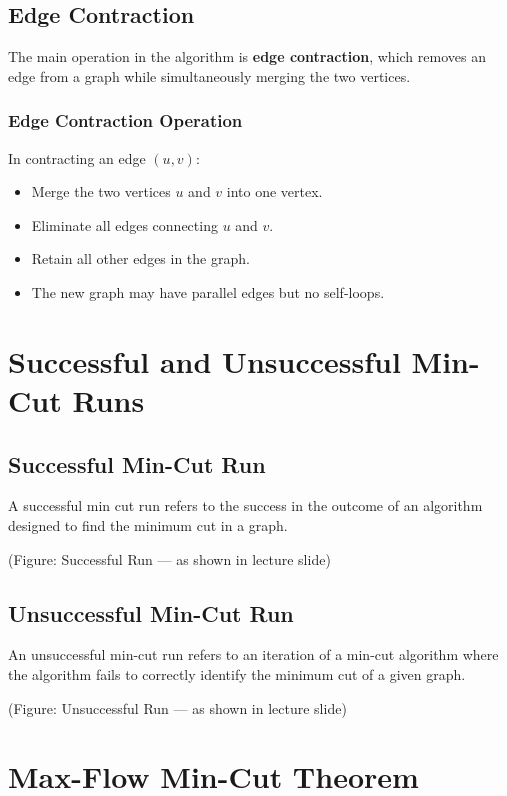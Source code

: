 \documentclass[12pt]{article}
\begin{document}
\subsection{Edge Contraction}

The main operation in the algorithm is \textbf{edge contraction}, which removes an edge from a graph while simultaneously merging the two vertices.

\subsubsection*{Edge Contraction Operation}

In contracting an edge \( (u, v) \):

\begin{itemize}
\item Merge the two vertices \( u \) and \( v \) into one vertex.
\item Eliminate all edges connecting \( u \) and \( v \).
\item Retain all other edges in the graph.
\item The new graph may have parallel edges but no self-loops.
\end{itemize}

\section{Successful and Unsuccessful Min-Cut Runs}

\subsection{Successful Min-Cut Run}

A successful min cut run refers to the success in the outcome of an algorithm designed to find the minimum cut in a graph.

(Figure: Successful Run — as shown in lecture slide)

\subsection{Unsuccessful Min-Cut Run}

An unsuccessful min-cut run refers to an iteration of a min-cut algorithm where the algorithm fails to correctly identify the minimum cut of a given graph.

(Figure: Unsuccessful Run — as shown in lecture slide)

\section{Max-Flow Min-Cut Theorem}
\end{document}
